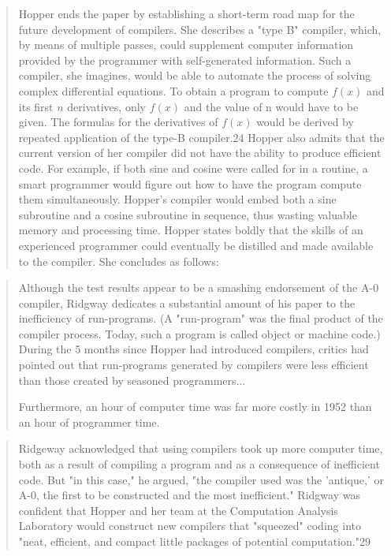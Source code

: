 \begin{quotation}
Hopper ends the paper by establishing a short-term road map
for the future development of compilers. She describes a "type B" compiler, which, by means of multiple passes, could supplement computer information provided by the programmer with
self-generated information. Such a compiler, she imagines, would
be able to automate the process of solving complex differential
equations. To obtain a program to compute $f(x)$ and its first $n$
derivatives, only $f(x)$ and the value of n would have to be given.
The formulas for the derivatives of $f(x)$ would be derived by
repeated application of the type-B compiler.24
Hopper also admits that the current version of her compiler
did not have the ability to produce efficient code. 
For example, if both sine and cosine were called for in a routine, 
a smart programmer would figure out how to have the program 
compute them simultaneously. Hopper's compiler would embed both
a sine subroutine and a cosine subroutine in sequence, thus
wasting valuable memory and processing time. Hopper states
boldly that the skills of an experienced programmer could eventually be distilled and made available to the compiler. She concludes as follows:
\end{quotation}

\begin{quotation}
Although the test results appear to be a smashing endorsement
of the A-0 compiler, Ridgway dedicates a substantial amount of
his paper to the inefficiency of run-programs. (A "run-program"
was the final product of the compiler process. Today, such a
program is called object or machine code.) During the 5 months
since Hopper had introduced compilers, critics had pointed out
that run-programs generated by compilers were less efficient than
those created by seasoned programmers... 

Furthermore, an hour of computer time was far more costly in 1952 than an hour of programmer time. 
\end{quotation}

\begin{quotation}
Ridgeway acknowledged that using compilers took up more
computer time, both as a result of compiling a program and as
a consequence of inefficient code. But "in this case," he argued,
"the compiler used was the 'antique,' or A-0, the first to be
constructed and the most inefficient." Ridgway was confident
that Hopper and her team at the Computation Analysis Laboratory would construct new compilers that "squeezed" coding
into "neat, efficient, and compact little packages of potential
computation."29
\end{quotation}


